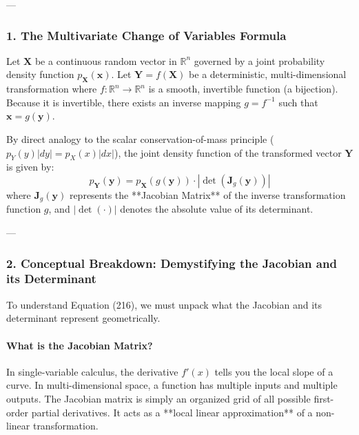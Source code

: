 \documentclass{article}
\begin{document}
---

\subsubsection*{1. The Multivariate Change of Variables Formula}

Let $\mathbf{X}$ be a continuous random vector in $\mathbb{R}^n$ governed by a joint probability density function $p_\mathbf{X}(\mathbf{x})$. Let $\mathbf{Y} = f(\mathbf{X})$ be a deterministic, multi-dimensional transformation where $f: \mathbb{R}^n \to \mathbb{R}^n$ is a smooth, invertible function (a bijection). Because it is invertible, there exists an inverse mapping $g = f^{-1}$ such that $\mathbf{x} = g(\mathbf{y})$.

By direct analogy to the scalar conservation-of-mass principle ($p_Y(y)|dy| = p_X(x)|dx|$), the joint density function of the transformed vector $\mathbf{Y}$ is given by:
\begin{equation}
p_\mathbf{Y}(\mathbf{y}) = p_\mathbf{X}(g(\mathbf{y})) \cdot \left| \det \left( \mathbf{J}_g(\mathbf{y}) \right) \right| \tag{216}
\end{equation}
where $\mathbf{J}_g(\mathbf{y})$ represents the **Jacobian Matrix** of the inverse transformation function $g$, and $\left| \det(\cdot) \right|$ denotes the absolute value of its determinant.

---

\subsubsection*{2. Conceptual Breakdown: Demystifying the Jacobian and its Determinant}

To understand Equation (216), we must unpack what the Jacobian and its determinant represent geometrically.

\paragraph{What is the Jacobian Matrix?}
In single-variable calculus, the derivative $f'(x)$ tells you the local slope of a curve. In multi-dimensional space, a function has multiple inputs and multiple outputs. The Jacobian matrix is simply an organized grid of all possible first-order partial derivatives. It acts as a **local linear approximation** of a non-linear transformation.
\end{document}
